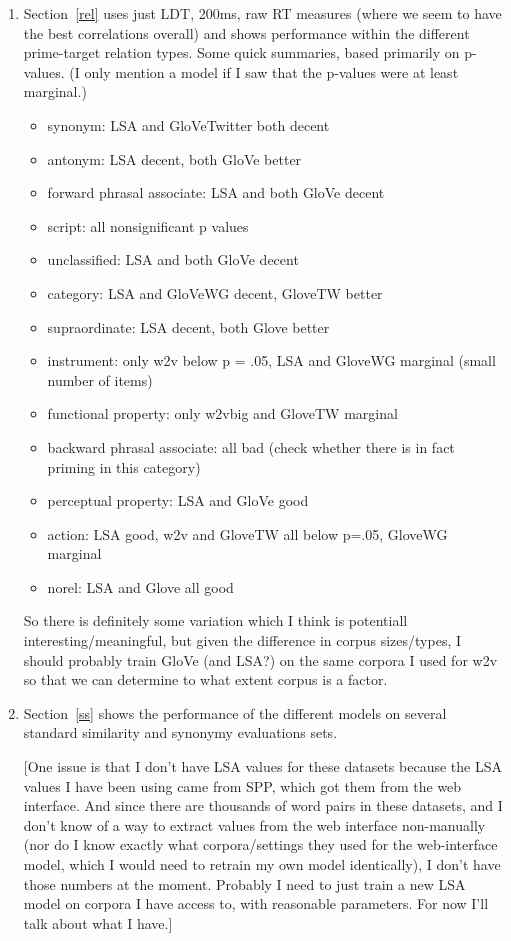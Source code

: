 \documentclass{article}
\begin{document}
\begin{enumerate}[1)]
\item Section~\ref{rel} uses just LDT, 200ms, raw RT measures (where we seem to have the best correlations overall) and shows performance within the different prime-target relation types. Some quick summaries, based primarily on p-values. (I only mention a model if I saw that the p-values were at least marginal.)
\begin{itemize}
\item synonym: LSA and GloVeTwitter both decent
\item antonym: LSA decent, both GloVe better
\item forward phrasal associate: LSA and both GloVe decent
\item script: all nonsignificant p values
\item unclassified: LSA and both GloVe decent
\item category: LSA and GloVeWG decent, GloveTW better
\item supraordinate: LSA decent, both Glove better
\item instrument: only w2v below p = .05, LSA and GloveWG marginal (small number of items)
\item functional property: only w2vbig and GloveTW marginal
\item backward phrasal associate: all bad (check whether there is in fact priming in this category)
\item perceptual property: LSA and GloVe good
\item action: LSA good, w2v and GloveTW all below p=.05, GloveWG marginal
\item norel: LSA and Glove all good
\end{itemize}
So there is definitely some variation which I think is potentiall interesting/meaningful, but given the difference in corpus sizes/types, I should probably train GloVe (and LSA?) on the same corpora I used for w2v so that we can determine to what extent corpus is a factor.

\item Section~\ref{ss} shows the performance of the different models on several standard similarity and synonymy evaluations sets. 

[One issue is that I don't have LSA values for these datasets because the LSA values I have been using came from SPP, which got them from the web interface. And since there are thousands of word pairs in these datasets, and I don't know of a way to extract values from the web interface non-manually (nor do I know exactly what corpora/settings they used for the web-interface model, which I would need to retrain my own model identically), I don't have those numbers at the moment. Probably I need to just train a new LSA model on corpora I have access to, with reasonable parameters. For now I'll talk about what I have.]


\end{enumerate}
\end{document}

